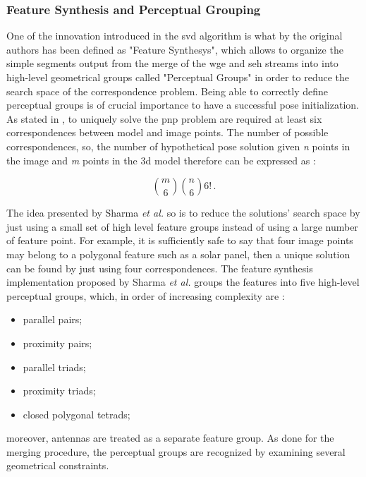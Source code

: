 \subsubsection{Feature Synthesis and Perceptual Grouping}
One of the innovation introduced in the \acrshort{svd} algorithm is what by the original authors has been defined as "Feature Synthesys", which allows to organize the simple segments output from the merge of the \acrshort{wge} and \acrshort{seh} streams into into high-level geometrical groups called "Perceptual Groups" in order to reduce the search space of the correspondence problem. Being able to correctly define perceptual groups is of crucial importance to have a successful pose initialization.
As stated in \cite{10.1145/358669.358692}, to uniquely solve the \acrshort{pnp} problem are required at least six correspondences between model and image points. The number of possible correspondences, so, the number of hypothetical pose solution given \textit{n} points in the image and \textit{m} points in the \acrshort{3d} model therefore can be expressed as \cite{Sharma2018}:

\begin{equation*}
\binom{m}{6} \binom{n}{6} 6! \,.
\end{equation*}

The idea presented by Sharma \textit{et al.} so is to reduce the solutions' search space by just using a small set of high level feature groups instead of using a large number of feature point. For example, it is sufficiently safe to say that four image points may belong to a polygonal feature such as a solar panel, then a unique solution can be found by just using four correspondences. The feature synthesis implementation proposed by Sharma \textit{et al.} groups the features into five high-level perceptual groups, which, in order of increasing complexity are :

\begin{itemize}
\item parallel pairs;
\item proximity pairs;
\item parallel triads;
\item proximity triads;
\item closed polygonal tetrads;
\end{itemize}

moreover, antennas are treated as a separate feature group. 
As done for the merging procedure, the perceptual groups are recognized by examining several geometrical constraints.

